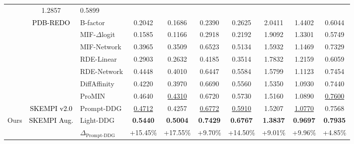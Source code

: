 \begin{table*}[!tbp]
\begin{center}
{\begin{tabular}{ccl|cc|ccccc}
 & 1.2857 & 0.5899 \\ \cmidrule(r){2-3}
 & \multirow{7}{*}{\textcolor{black}{PDB-REDO}} & B-factor & 0.2042 & 0.1686 & 0.2390 & 0.2625 & 2.0411 & 1.4402 & 0.6044 \\
 & & MIF-$\Delta$logit & 0.1585 & 0.1166 & 0.2918 & 0.2192 & 1.9092 & 1.3301 & 0.5749 \\
 & & MIF-Network & 0.3965 & 0.3509 & 0.6523 & 0.5134 & 1.5932 & 1.1469 & 0.7329 \\
 & & RDE-Linear & 0.2903 & 0.2632 & 0.4185 & 0.3514 & 1.7832 & 1.2159 & 0.6059 \\
 & & RDE-Network & 0.4448 & 0.4010 & 0.6447 & 0.5584 & 1.5799 & 1.1123 & 0.7454 \\
 & & DiffAffinity & 0.4220 & 0.3970 & 0.6690 & 0.5560 & 1.5350 & 1.0930 & 0.7440 \\
 & & ProMIN & 0.4640 & \underline{0.4310} & 0.6720 & 0.5730 & 1.5160 & 1.0890 & \underline{0.7600} \\ \cmidrule(r){2-3}
 & \textcolor{black}{SKEMPI v2.0} & Prompt-DDG & \underline{0.4712} & 0.4257 & \underline{0.6772} & \underline{0.5910} & 1.5207 & \underline{1.0770} & 0.7568 \\ \midrule
 \multirow{2}{*}{Ours} & \multirow{2}{*}{\textcolor{black}{SKEMPI Aug.}} & Light-DDG & \textbf{0.5440} & \textbf{0.5004} & \textbf{0.7429} & \textbf{0.6767} & \textbf{1.3837} & \textbf{0.9697} & \textbf{0.7935} \\
 & & $\Delta_{\text{Prompt-DDG}}$ & +15.45\% & +17.55\% & +9.70\% & +14.50\% & +9.01\% & +9.96\% & +4.85\% \\ \bottomrule

\end{tabular}} \vspace{-1em}
\end{center}
\end{table*} 